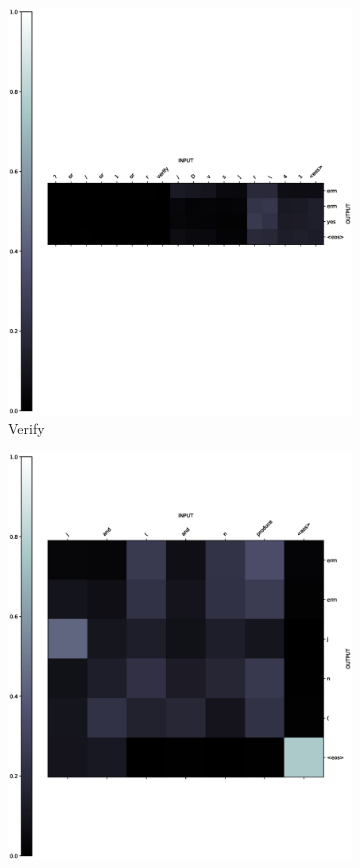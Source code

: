 \begin{figure}[ht] 
	\begin{subfigure}[b]{0.5\linewidth}
		\centering
		\includegraphics[width=0.95\linewidth]{./figs/micro/base-verify-eps}
		\caption{Verify} 
		\label{base-ver} 
		\vspace{2ex}
	\end{subfigure}%
	\begin{subfigure}[b]{0.5\linewidth}
		\centering
		\includegraphics[width=0.95\linewidth]{./figs/micro/base-prod-eps}

\end{subfigure}
\end{figure}
